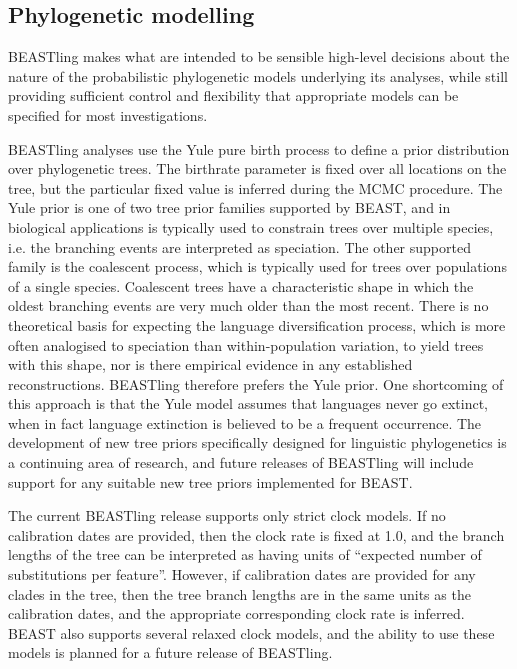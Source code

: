 \documentclass[twocolumn,10pt]{scrartcl}
\begin{document}
\subsection{Phylogenetic modelling}

BEASTling makes what are intended to be sensible high-level decisions about the nature of the probabilistic phylogenetic models underlying its analyses, while still providing sufficient control and flexibility that appropriate models can be specified for most investigations.

BEASTling analyses use the Yule pure birth process to define a prior distribution over phylogenetic trees.  The birthrate parameter is fixed over all locations on the tree, but the particular fixed value is inferred during the MCMC procedure.  The Yule prior is one of two tree prior families supported by BEAST, and in biological applications is typically used to constrain trees over multiple species, i.e. the branching events are interpreted as speciation.  The other supported family is the coalescent process, which is typically used for trees over populations of a single species.  Coalescent trees have a characteristic shape in which the oldest branching events are very much older than the most recent.  There is no theoretical basis for expecting the language diversification process, which is more often analogised to speciation than within-population variation, to yield trees with this shape, nor is there empirical evidence in any established reconstructions.  BEASTling therefore prefers the Yule prior.  One shortcoming of this approach is that the Yule model assumes that languages never go extinct, when in fact language extinction is believed to be a frequent occurrence.  The development of new tree priors specifically designed for linguistic phylogenetics is a continuing area of research, and future releases of BEASTling will include support for any suitable new tree priors implemented for BEAST.

The current BEASTling release supports only strict clock models.  If no calibration dates are provided, then the clock rate is fixed at 1.0, and the branch lengths of the tree can be interpreted as having units of ``expected number of substitutions per feature''.  However, if calibration dates are provided for any clades in the tree, then the tree branch lengths are in the same units as the calibration dates, and the appropriate corresponding clock rate is inferred.  BEAST also supports several relaxed clock models\cite{Drummond2006}, and the ability to use these models is planned for a future release of BEASTling.
\end{document}
